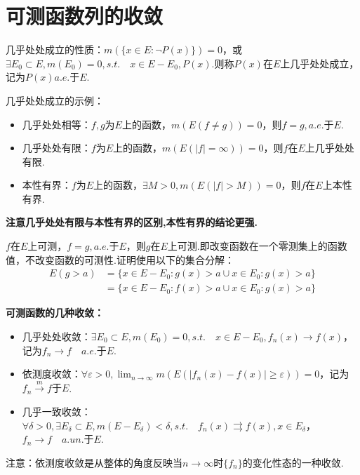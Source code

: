 \documentclass[bwprint, withoutpreface]{cumcmthesis}
\begin{document}
\section{可测函数列的收敛}

\indent 几乎处处成立的性质：$m(\{x \in E: \neg P(x)\}) = 0$，或$\exists E_0 \subset E, m(E_0) = 0, s.t. \quad x \in E - E_0, P(x)$.则称$P(x)$在$E$上几乎处处成立，记为$P(x) a.e. \mbox{于} E$.

几乎处处成立的示例：
\begin{itemize}[itemindent=2em]
	\item 几乎处处相等：$f, g$为$E$上的函数，$m(E(f \neq g)) = 0$，则$f = g, a.e.\mbox{于}E$.
	\item 几乎处处有限：$f$为$E$上的函数，$m(E(|f| = \infty)) = 0$，则$f$在$E$上几乎处处有限.
	\item 本性有界：$f$为$E$上的函数，$\exists M > 0, m(E(|f| > M)) = 0$，则$f$在$E$上本性有界.
\end{itemize}   

\textbf{注意几乎处处有限与本性有界的区别,本性有界的结论更强.}

$f$在$E$上可测，$f = g, a.e.\mbox{于}E$，则$g$在$E$上可测.即改变函数在一个零测集上的函数值，不改变函数的可测性.证明使用以下的集合分解：
\begin{align*}
	E(g > a) & = {\{x \in E - E_0: g(x) > a} \cup {x \in E_0: g(x) > a\}} \\
			 & = {\{x \in E - E_0: f(x) > a} \cup {x \in E_0: g(x) > a\}}
\end{align*}

\textbf{可测函数的几种收敛：}
\begin{itemize}[itemindent=2em]
	\item 几乎处处收敛：$\exists E_0 \subset E, m(E_0) = 0, s.t. \quad x \in E - E_0, f_n(x) \to f(x)$，记为$f_n \to f \quad a.e. \mbox{于}E$.
	\item 依测度收敛：$\forall \varepsilon > 0, \lim_{n \to \infty}{m(E(|f_n(x) - f(x)| \geqslant \varepsilon))} = 0$，记为$f_n \stackrel{m}{\longrightarrow} f\mbox{于}E$.
	\item 几乎一致收敛：$\forall \delta > 0, \exists E_{\delta} \subset E, m(E - E_{\delta}) < \delta, s.t. \quad f_n(x) \rightrightarrows f(x), x \in E_{\delta}$，$f_n \to f \quad a.un. \mbox{于}E$.
\end{itemize}

注意：依测度收敛是从整体的角度反映当$n \to \infty$时$\{f_n\}$的变化性态的一种收敛.
\end{document}
